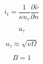 

\begin{equation}
i_t = \frac{1}{\kappa u_{\tau}} \frac{\partial \hat \nu}{\partial n}
\end{equation}

\begin{equation}
u_{\tau}
\end{equation}

\begin{equation}
u_{\tau} \approx \sqrt{\nu \Omega}
\end{equation}

\begin{equation}
B=1
\end{equation}


